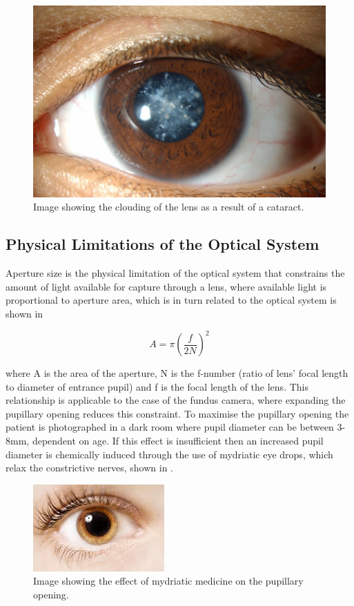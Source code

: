 \begin{figure}[H]
\centering
\includegraphics{figures/cataract}
\caption{Image showing the clouding of the lens as a result of a cataract.\cite{yannuzzi2011retinal}}
\label{fig:cat}
   \end{figure}

\subsection{Physical Limitations of the Optical System}

Aperture size is the physical limitation of the optical system that
constrains the amount of light available for capture through a lens,
where available light is proportional to aperture area, which is in
turn related to the optical system is shown in 

\begin{equation}
A = \pi({\frac{f}{2N}})^2
\label{eq:optical_system}
\end{equation}

where A is the area of the aperture, N is the f-number (ratio of lens'
focal length to diameter of entrance pupil) and f is the focal length
of the lens. This relationship is applicable to the case of the fundus
camera, where expanding the pupillary opening reduces this constraint.
To maximise the pupillary opening the patient is photographed in a
dark room where pupil diameter can be between 3-8mm, dependent
on age. If this effect is insufficient then an increased pupil diameter is
chemically induced through the use of mydriatic eye drops, which relax
the constrictive nerves, shown in .

\begin{figure}[H]
\centering
\includegraphics{figures/mydriasis}
\caption{Image showing the effect of mydriatic medicine on the pupillary opening.\cite{yannuzzi2011retinal}}
\label{fig:myd}
   \end{figure}


